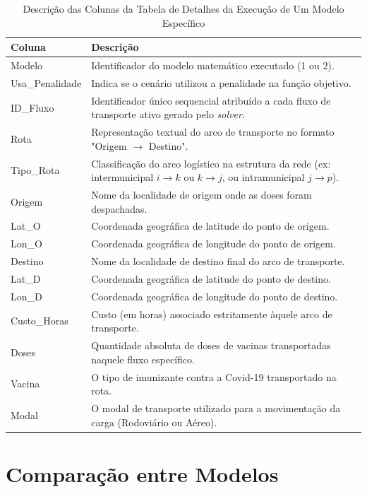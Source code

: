 \begin{longtable}{|l|p{8.5cm}|}
\caption{Descrição das Colunas da Tabela de Detalhes da Execução de Um Modelo Específico} \label{tab:colunas_detalhes} \\
\hline
\textbf{Coluna} & \textbf{Descrição} \\ \hline
\endhead

\hline \endfoot

Modelo & Identificador do modelo matemático executado (1 ou 2). \\ \hline
Usa\_Penalidade & Indica se o cenário utilizou a penalidade na função objetivo. \\ \hline
ID\_Fluxo & Identificador único sequencial atribuído a cada fluxo de transporte ativo gerado pelo \textit{solver}. \\ \hline
Rota & Representação textual do arco de transporte no formato "Origem $\to$ Destino". \\ \hline
Tipo\_Rota & Classificação do arco logístico na estrutura da rede (ex: intermunicipal $i \to k$ ou $k \to j$, ou intramunicipal $j \to p$). \\ \hline
Origem & Nome da localidade de origem onde as doses foram despachadas. \\ \hline
Lat\_O & Coordenada geográfica de latitude do ponto de origem. \\ \hline
Lon\_O & Coordenada geográfica de longitude do ponto de origem. \\ \hline
Destino & Nome da localidade de destino final do arco de transporte. \\ \hline
Lat\_D & Coordenada geográfica de latitude do ponto de destino. \\ \hline
Lon\_D & Coordenada geográfica de longitude do ponto de destino. \\ \hline
Custo\_Horas & Custo (em horas) associado estritamente àquele arco de transporte. \\ \hline
Doses & Quantidade absoluta de doses de vacinas transportadas naquele fluxo específico. \\ \hline
Vacina & O tipo de imunizante contra a Covid-19 transportado na rota. \\ \hline
Modal & O modal de transporte utilizado para a movimentação da carga (Rodoviário ou Aéreo). \\ \hline
\end{longtable}


\section{Comparação entre Modelos}

